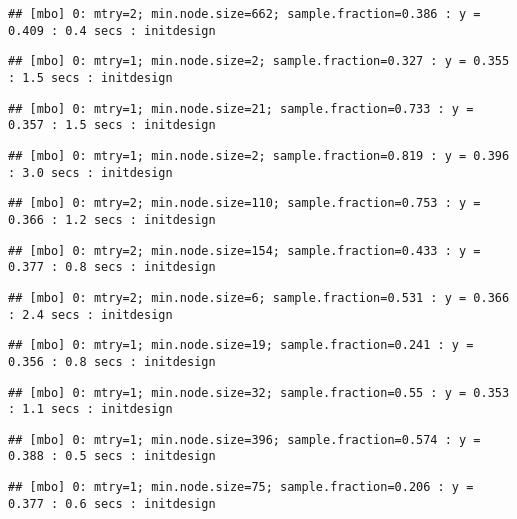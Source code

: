 \documentclass[
]{article}
\begin{document}
\begin{verbatim}
## [mbo] 0: mtry=2; min.node.size=662; sample.fraction=0.386 : y = 0.409 : 0.4 secs : initdesign
\end{verbatim}

\begin{verbatim}
## [mbo] 0: mtry=1; min.node.size=2; sample.fraction=0.327 : y = 0.355 : 1.5 secs : initdesign
\end{verbatim}

\begin{verbatim}
## [mbo] 0: mtry=1; min.node.size=21; sample.fraction=0.733 : y = 0.357 : 1.5 secs : initdesign
\end{verbatim}

\begin{verbatim}
## [mbo] 0: mtry=1; min.node.size=2; sample.fraction=0.819 : y = 0.396 : 3.0 secs : initdesign
\end{verbatim}

\begin{verbatim}
## [mbo] 0: mtry=2; min.node.size=110; sample.fraction=0.753 : y = 0.366 : 1.2 secs : initdesign
\end{verbatim}

\begin{verbatim}
## [mbo] 0: mtry=2; min.node.size=154; sample.fraction=0.433 : y = 0.377 : 0.8 secs : initdesign
\end{verbatim}

\begin{verbatim}
## [mbo] 0: mtry=2; min.node.size=6; sample.fraction=0.531 : y = 0.366 : 2.4 secs : initdesign
\end{verbatim}

\begin{verbatim}
## [mbo] 0: mtry=1; min.node.size=19; sample.fraction=0.241 : y = 0.356 : 0.8 secs : initdesign
\end{verbatim}

\begin{verbatim}
## [mbo] 0: mtry=1; min.node.size=32; sample.fraction=0.55 : y = 0.353 : 1.1 secs : initdesign
\end{verbatim}

\begin{verbatim}
## [mbo] 0: mtry=1; min.node.size=396; sample.fraction=0.574 : y = 0.388 : 0.5 secs : initdesign
\end{verbatim}

\begin{verbatim}
## [mbo] 0: mtry=1; min.node.size=75; sample.fraction=0.206 : y = 0.377 : 0.6 secs : initdesign
\end{verbatim}
\end{document}
